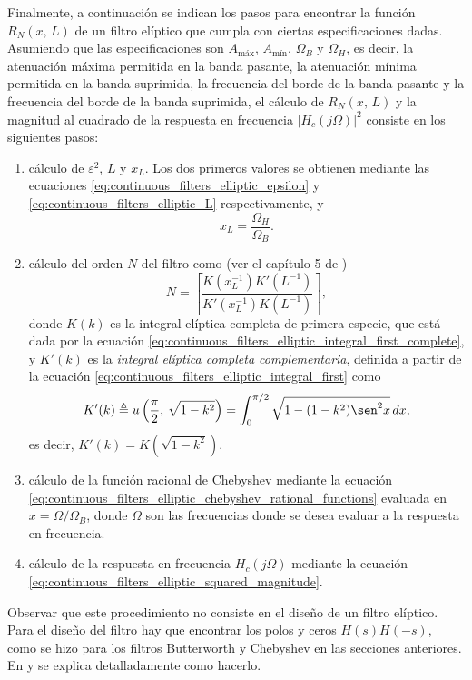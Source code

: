 \documentclass[a4paper]{report}
\begin{document}
Finalmente, a continuación se indican los pasos para encontrar la función \(R_N(x,\,L)\) de un filtro elíptico que cumpla con ciertas especificaciones dadas. Asumiendo que las especificaciones son \(A_\textrm{máx}\), \(A_\textrm{mín}\), \(\Omega_B\) y \(\Omega_H\), es decir, la atenuación máxima permitida en la banda pasante, la atenuación mínima permitida en la banda suprimida, la frecuencia del borde de la banda pasante y la frecuencia del  borde de la banda suprimida, el cálculo de \(R_N(x,\,L)\) y la magnitud al cuadrado de la respuesta en frecuencia \(|H_c(j\Omega)|^2\) consiste en los siguientes pasos:
\begin{enumerate}
 \item cálculo de \(\varepsilon^2\), \(L\) y \(x_L\). Los dos primeros valores se obtienen mediante las ecuaciones \ref{eq:continuous_filters_elliptic_epsilon} y \ref{eq:continuous_filters_elliptic_L} respectivamente, y
 \[
  x_L=\frac{\Omega_H}{\Omega_B}.
 \]
 \item cálculo del orden \(N\) del filtro como (ver el capítulo 5 de \cite{daniels1974approximation})
 \[
  N=\left\lceil\frac{K(x_L^{-1})K'(L^{-1})}{K'(x_L^{-1})K(L^{-1})}\right\rceil,
 \]
 donde \(K(k)\) es la integral elíptica completa de primera especie, que está dada por la ecuación \ref{eq:continuous_filters_elliptic_integral_first_complete}, y \(K'(k)\) es la \emph{integral elíptica completa complementaria}, definida a partir de la ecuación \ref{eq:continuous_filters_elliptic_integral_first} como
 \[
  K'(k)\triangleq u\left(\frac{\pi}{2},\,\sqrt{1-k^2}\right)=\int_0^{\pi/2}\sqrt{1-(1-k^2)\sen^2x}\,dx,
 \]
 es decir, \(K'(k)=K(\sqrt{1-k^2})\).
 \item cálculo de la función racional de Chebyshev mediante la ecuación \ref{eq:continuous_filters_elliptic_chebyshev_rational_functions} evaluada en \(x=\Omega/\Omega_B\), donde \(\Omega\) son las frecuencias donde se desea evaluar a la respuesta en frecuencia.
 \item cálculo de la respuesta en frecuencia \(H_c(j\Omega)\) mediante la ecuación \ref{eq:continuous_filters_elliptic_squared_magnitude}. 
\end{enumerate}
Observar que este procedimiento no consiste en el diseño de un filtro elíptico. Para el diseño del filtro hay que encontrar los polos y ceros \(H(s)H(-s)\), como se hizo para los filtros Butterworth y Chebyshev en las secciones anteriores. En \cite{daniels1974approximation} y \cite{orfanidis2006lecture} se explica detalladamente como hacerlo.













































\end{document}
